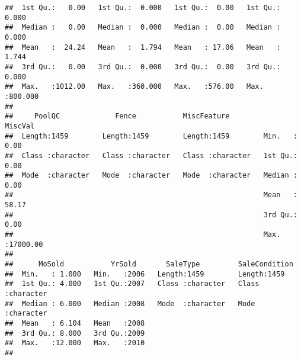 \documentclass[
]{article}
\begin{document}
\begin{verbatim}
##  1st Qu.:   0.00   1st Qu.:  0.000   1st Qu.:  0.00   1st Qu.:  0.000  
##  Median :   0.00   Median :  0.000   Median :  0.00   Median :  0.000  
##  Mean   :  24.24   Mean   :  1.794   Mean   : 17.06   Mean   :  1.744  
##  3rd Qu.:   0.00   3rd Qu.:  0.000   3rd Qu.:  0.00   3rd Qu.:  0.000  
##  Max.   :1012.00   Max.   :360.000   Max.   :576.00   Max.   :800.000  
##                                                                        
##     PoolQC             Fence           MiscFeature           MiscVal        
##  Length:1459        Length:1459        Length:1459        Min.   :    0.00  
##  Class :character   Class :character   Class :character   1st Qu.:    0.00  
##  Mode  :character   Mode  :character   Mode  :character   Median :    0.00  
##                                                           Mean   :   58.17  
##                                                           3rd Qu.:    0.00  
##                                                           Max.   :17000.00  
##                                                                             
##      MoSold           YrSold       SaleType         SaleCondition     
##  Min.   : 1.000   Min.   :2006   Length:1459        Length:1459       
##  1st Qu.: 4.000   1st Qu.:2007   Class :character   Class :character  
##  Median : 6.000   Median :2008   Mode  :character   Mode  :character  
##  Mean   : 6.104   Mean   :2008                                        
##  3rd Qu.: 8.000   3rd Qu.:2009                                        
##  Max.   :12.000   Max.   :2010                                        
## 
\end{verbatim}
\end{document}
